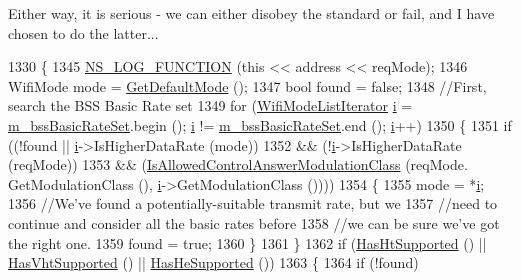Either way, it is serious -\/ we can either disobey the standard or fail, and I have chosen to do the latter...
\begin{DoxyCode}
1330 \{
1345   \hyperlink{log-macros-disabled_8h_a90b90d5bad1f39cb1b64923ea94c0761}{NS\_LOG\_FUNCTION} (\textcolor{keyword}{this} << address << reqMode);
1346   WifiMode mode = \hyperlink{classns3_1_1WifiRemoteStationManager_a54cc63cdbc8067b7f737be74a9e0081c}{GetDefaultMode} ();
1347   \textcolor{keywordtype}{bool} found = \textcolor{keyword}{false};
1348   \textcolor{comment}{//First, search the BSS Basic Rate set}
1349   \textcolor{keywordflow}{for} (\hyperlink{namespacens3_a652d37bfd751d39eea327ca3402f6196}{WifiModeListIterator} \hyperlink{bernuolliDistribution_8m_a6f6ccfcf58b31cb6412107d9d5281426}{i} = \hyperlink{classns3_1_1WifiRemoteStationManager_acc2500f3f9208b6227adf57bbebb5bd7}{m\_bssBasicRateSet}.begin (); 
      \hyperlink{bernuolliDistribution_8m_a6f6ccfcf58b31cb6412107d9d5281426}{i} != \hyperlink{classns3_1_1WifiRemoteStationManager_acc2500f3f9208b6227adf57bbebb5bd7}{m\_bssBasicRateSet}.end (); \hyperlink{bernuolliDistribution_8m_a6f6ccfcf58b31cb6412107d9d5281426}{i}++)
1350     \{
1351       \textcolor{keywordflow}{if} ((!found || \hyperlink{bernuolliDistribution_8m_a6f6ccfcf58b31cb6412107d9d5281426}{i}->IsHigherDataRate (mode))
1352           && (!\hyperlink{bernuolliDistribution_8m_a6f6ccfcf58b31cb6412107d9d5281426}{i}->IsHigherDataRate (reqMode))
1353           && (\hyperlink{classns3_1_1WifiRemoteStationManager_a209bd05c4a1f589c7045ff1dfbe5eff2}{IsAllowedControlAnswerModulationClass} (reqMode.
      GetModulationClass (), \hyperlink{bernuolliDistribution_8m_a6f6ccfcf58b31cb6412107d9d5281426}{i}->GetModulationClass ())))
1354         \{
1355           mode = *\hyperlink{bernuolliDistribution_8m_a6f6ccfcf58b31cb6412107d9d5281426}{i};
1356           \textcolor{comment}{//We've found a potentially-suitable transmit rate, but we}
1357           \textcolor{comment}{//need to continue and consider all the basic rates before}
1358           \textcolor{comment}{//we can be sure we've got the right one.}
1359           found = \textcolor{keyword}{true};
1360         \}
1361     \}
1362   \textcolor{keywordflow}{if} (\hyperlink{classns3_1_1WifiRemoteStationManager_ac792dc8f3c77d507d25de0b87b52608c}{HasHtSupported} () || \hyperlink{classns3_1_1WifiRemoteStationManager_afae2836c7785854272d73bf33e58c95a}{HasVhtSupported} () || 
      \hyperlink{classns3_1_1WifiRemoteStationManager_a5c442e5a306eab9a69b7cd2dcead57dc}{HasHeSupported} ())
1363     \{
1364       \textcolor{keywordflow}{if} (!found)

\end{DoxyCode}
